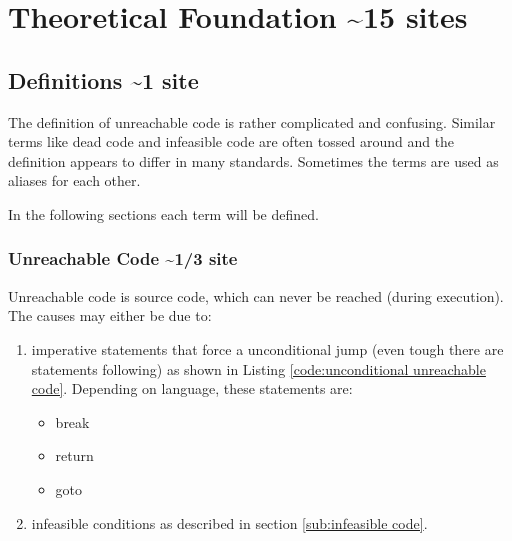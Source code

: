 
\chapter {Theoretical Foundation \textasciitilde 15 sites}
\label {cha:theoretical foundation}

\section{Definitions \textasciitilde 1 site}
\label{sec:definitions}

The definition of unreachable code is rather complicated and confusing. 
Similar terms like dead code and infeasible code are often tossed around and the definition appears to differ in many standards. 
Sometimes the terms are used as aliases for each other.


In the following sections each term will be defined.

\subsection{Unreachable Code \textasciitilde 1/3 site}
\label{sub:unreachable code}
Unreachable code is source code, which can never be reached (during execution). 
The causes may either be due to:
\begin{enumerate}
	\item imperative statements that force a unconditional jump (even tough there are statements following) as shown in Listing \ref{code:unconditional unreachable code}. Depending on language, these statements are: 
	\begin{itemize}
		\item break
		\item return
		\item goto
	\end{itemize}
	\item infeasible conditions as described in section \ref{sub:infeasible code}. 
\end{enumerate}


